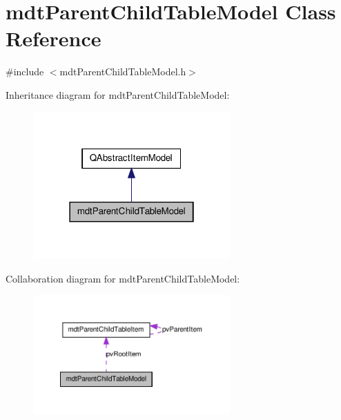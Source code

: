 \hypertarget{classmdt_parent_child_table_model}{\section{mdt\-Parent\-Child\-Table\-Model Class Reference}
\label{classmdt_parent_child_table_model}
}


{\ttfamily \#include $<$mdt\-Parent\-Child\-Table\-Model.\-h$>$}



Inheritance diagram for mdt\-Parent\-Child\-Table\-Model\-:
\nopagebreak
\begin{figure}[H]
\begin{center}
\leavevmode
\includegraphics[width=214pt]{classmdt_parent_child_table_model__inherit__graph}
\end{center}
\end{figure}


Collaboration diagram for mdt\-Parent\-Child\-Table\-Model\-:
\nopagebreak
\begin{figure}[H]
\begin{center}
\leavevmode
\includegraphics[width=214pt]{classmdt_parent_child_table_model__coll__graph}
\end{center}
\end{figure}

